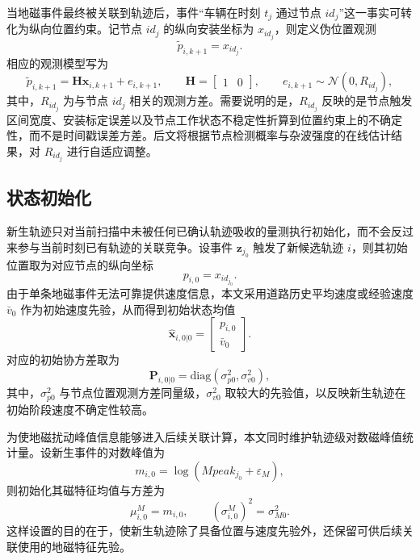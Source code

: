 \documentclass{xdupgthesis}
\begin{document}
当地磁事件最终被关联到轨迹后，事件“车辆在时刻 $t_j$ 通过节点 $id_j$”这一事实可转化为纵向位置约束。记节点 $id_j$ 的纵向安装坐标为 $x_{id_j}$，则定义伪位置观测
\begin{equation}
	\tilde p_{i,k+1}=x_{id_j}.
	\label{eq:ch3_pseudo_meas}
\end{equation}
相应的观测模型写为
\begin{equation}
	\tilde p_{i,k+1}=\mathbf H\mathbf x_{i,k+1}+e_{i,k+1},
	\qquad
	\mathbf H=
	\begin{bmatrix}
		1 & 0
	\end{bmatrix},
	\qquad
	e_{i,k+1}\sim\mathcal N(0,R_{id_j}),
	\label{eq:ch3_measurement_k}
\end{equation}
其中，$R_{id_j}$ 为与节点 $id_j$ 相关的观测方差。需要说明的是，$R_{id_j}$ 反映的是节点触发区间宽度、安装标定误差以及节点工作状态不稳定性折算到位置约束上的不确定性，而不是时间戳误差方差。后文将根据节点检测概率与杂波强度的在线估计结果，对 $R_{id_j}$ 进行自适应调整。

\subsection{状态初始化}

新生轨迹只对当前扫描中未被任何已确认轨迹吸收的量测执行初始化，而不会反过来参与当前时刻已有轨迹的关联竞争。设事件 $\mathbf z_{j_0}$ 触发了新候选轨迹 $i$，则其初始位置取为对应节点的纵向坐标
\begin{equation}
	p_{i,0}=x_{id_{j_0}}.
	\label{eq:ch3_init_pos}
\end{equation}
由于单条地磁事件无法可靠提供速度信息，本文采用道路历史平均速度或经验速度 $\bar v_0$ 作为初始速度先验，从而得到初始状态均值
\begin{equation}
	\hat{\mathbf x}_{i,0|0}=
	\begin{bmatrix}
		p_{i,0}\\
		\bar v_0
	\end{bmatrix}.
	\label{eq:ch3_init_state}
\end{equation}
对应的初始协方差取为
\begin{equation}
	\mathbf P_{i,0|0}=\mathrm{diag}\left(\sigma_{p0}^{2},\sigma_{v0}^{2}\right),
	\label{eq:ch3_init_cov}
\end{equation}
其中，$\sigma_{p0}^{2}$ 与节点位置观测方差同量级，$\sigma_{v0}^{2}$ 取较大的先验值，以反映新生轨迹在初始阶段速度不确定性较高。

为使地磁扰动峰值信息能够进入后续关联计算，本文同时维护轨迹级对数磁峰值统计量。设新生事件的对数峰值为
\begin{equation}
	m_{i,0}=\log(Mpeak_{j_0}+\varepsilon_M),
	\label{eq:ch3_init_mag}
\end{equation}
则初始化其磁特征均值与方差为
\begin{equation}
	\mu_{i,0}^{M}=m_{i,0},
	\qquad
	(\sigma_{i,0}^{M})^{2}=\sigma_{M0}^{2}.
	\label{eq:ch3_init_mag_stat}
\end{equation}
这样设置的目的在于，使新生轨迹除了具备位置与速度先验外，还保留可供后续关联使用的地磁特征先验。
\end{document}
